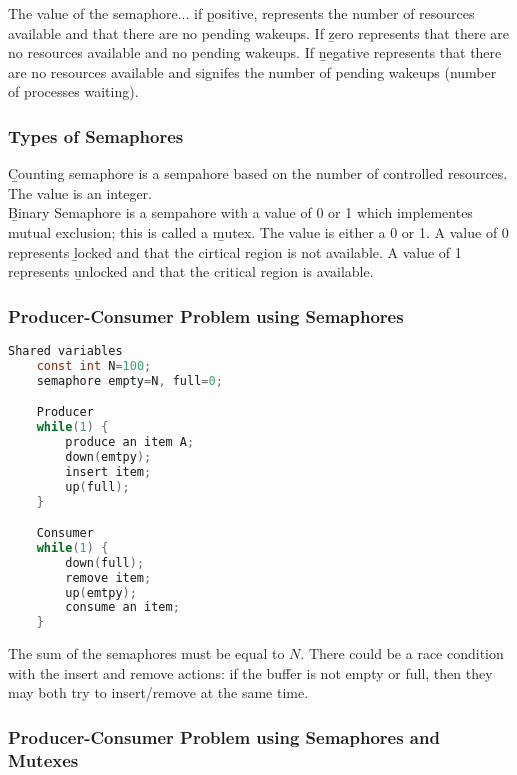 \documentclass{article}
\begin{document}
    \noindent The value of the semaphore... if \b{positive}, represents the number of resources available and that there are no pending wakeups. If \b{zero} represents that there are no resources available and no pending wakeups. If \b{negative} represents that there are no resources available and signifes the number of pending wakeups (number of processes waiting). 

    \subsubsection{Types of Semaphores}

    \b{Counting semaphore} is a sempahore based on the number of controlled resources. The value is an integer. \\ 

    \noindent \b{Binary Semaphore} is a sempahore with a value of 0 or 1 which implementes mutual exclusion; this is called a \b{mutex}. The value is either a 0 or 1. A value of 0 represents \b{locked} and that the cirtical region is not available. A value of 1 represents \b{unlocked} and that the critical region is available.

    \subsubsection{Producer-Consumer Problem using Semaphores}

    \begin{lstlisting}[language=C]
    Shared variables
    const int N=100;
    semaphore empty=N, full=0;

    Producer
    while(1) {
        produce an item A; 
        down(emtpy);
        insert item;
        up(full);
    }

    Consumer 
    while(1) {
        down(full);
        remove item;
        up(emtpy);
        consume an item;
    }
    \end{lstlisting}

    \noindent The sum of the semaphores must be equal to $N$. There could be a race condition with the insert and remove actions: if the buffer is not empty or full, then they may both try to insert/remove at the same time. \\
    
    \subsubsection{Producer-Consumer Problem using Semaphores and Mutexes}
\end{document}
